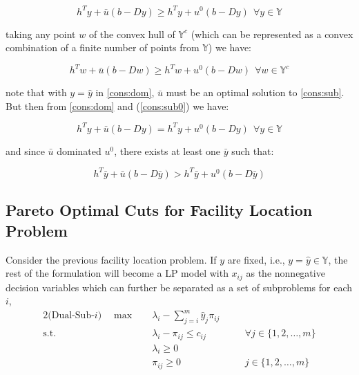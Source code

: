                 \begin{equation}
                    h^Ty + \bar{u}(b - Dy) \ge h^Ty + u^0(b - Dy)\ \ \forall y \in \mathbb{Y} \label{cons:dom}
                \end{equation}

                taking any point $w$ of the convex hull of $\mathbb{Y}^c$ (which can be represented as a convex combination of a finite number of points from $\mathbb{Y}$) we have:

                \begin{equation}
                    h^Tw + \bar{u}(b - Dw) \ge h^Tw + u^0(b - Dw)\ \ \forall w \in \mathbb{Y}^c
                \end{equation}

                note that with $y=\hat{y}$ in \ref{cons:dom}, $\bar{u}$ must be an optimal solution to \ref{cons:sub}. But then from \ref{cons:dom} and (\ref{cons:sub0}) we have:

                \begin{equation}
                    h^Ty + \bar{u}(b - Dy) = h^Ty + u^0(b - Dy)\ \ \forall y \in \mathbb{Y}
                \end{equation}

                and since $\bar{u}$ dominated $u^0$, there exists at least one $\bar{y}$ such that:

                \begin{equation}
                    h^T\bar{y} + \bar{u}(b - D\bar{y}) > h^T\bar{y} + u^0(b - D\bar{y})
                \end{equation}

            \subsection{Pareto Optimal Cuts for Facility Location Problem}
                Consider the previous facility location problem. If $y$ are fixed, i.e., $y = \hat{y} \in \mathbb{Y}$, the rest of the formulation will become a LP model with $x_{ij}$ as the nonnegative decision variables which can further be separated as a set of subproblems for each $i$, 
                \begin{alignat*}{2}
                    \text{(Dual-Sub-$i$)} \quad \max \quad & \lambda_i - \sum_{j = i}^m \hat{y}_j \pi_{ij}\\
                    \text{s.t.} \quad & \lambda_i - \pi_{ij} \le c_{ij}                  && \quad \forall j \in \{1, 2, \ldots, m\}\\
                                      & \lambda_i \ge 0                                  && \\
                                      & \pi_{ij} \ge 0                                   && \quad j \in \{1, 2, \ldots, m\}\\
                \end{alignat*}

